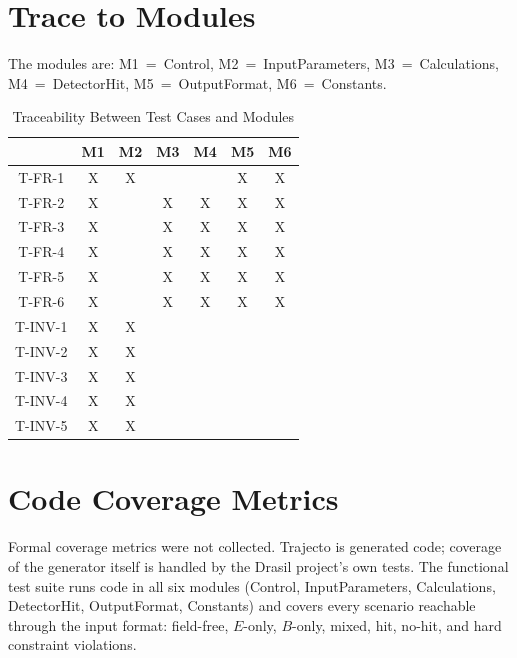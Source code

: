 \documentclass[12pt, titlepage]{article}
\begin{document}
\section{Trace to Modules}

The modules are: M1~=~Control, M2~=~InputParameters, M3~=~Calculations,
M4~=~DetectorHit, M5~=~OutputFormat, M6~=~Constants.

\begin{table}[ht]
\caption{Traceability Between Test Cases and Modules}
\label{tab:trace-mod}
\centering
\begin{tabular}{|c|c|c|c|c|c|c|}
\hline
         & M1 & M2 & M3 & M4 & M5 & M6 \\
\hline
T-FR-1   & X  & X  &    &    & X  & X  \\
\hline
T-FR-2   & X  &    & X  & X  & X  & X  \\
\hline
T-FR-3   & X  &    & X  & X  & X  & X  \\
\hline
T-FR-4   & X  &    & X  & X  & X  & X  \\
\hline
T-FR-5   & X  &    & X  & X  & X  & X  \\
\hline
T-FR-6   & X  &    & X  & X  & X  & X  \\
\hline
T-INV-1  & X  & X  &    &    &    &    \\
\hline
T-INV-2  & X  & X  &    &    &    &    \\
\hline
T-INV-3  & X  & X  &    &    &    &    \\
\hline
T-INV-4  & X  & X  &    &    &    &    \\
\hline
T-INV-5  & X  & X  &    &    &    &    \\
\hline
\end{tabular}
\end{table}

\section{Code Coverage Metrics}

Formal coverage metrics were not collected.
Trajecto is generated code; coverage of the generator itself is handled by
the Drasil project's own tests.
The functional test suite runs code in all six modules (Control,
InputParameters, Calculations, DetectorHit, OutputFormat, Constants) and
covers every scenario reachable through the input format: field-free,
$E$-only, $B$-only, mixed, hit, no-hit, and hard constraint violations.
\end{document}
